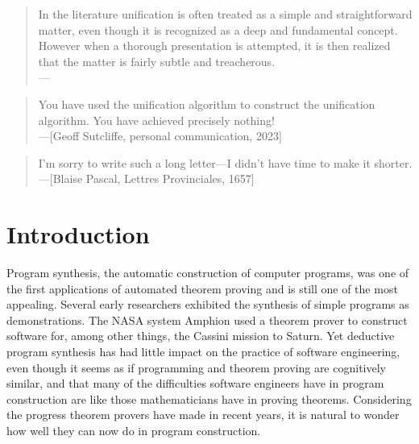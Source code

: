 \documentclass[runningheads]{llncs}
\begin{document}
%
%
%
\begin{quote}
  In the literature unification is often treated as a simple and straightforward matter, even though it is recognized as a deep and fundamental concept. However when a thorough presentation is attempted, it is then realized that the matter is fairly subtle and treacherous.
  \\---\citep{las:mah:mar}
 
\end{quote}

\begin{quote}
  You have used the unification algorithm to construct the unification algorithm.  You have achieved precisely nothing!
  \\---[Geoff Sutcliffe, personal communication, 2023]
\end{quote}

\begin{quote}
I'm sorry to write such a long letter---I didn't have time to make it shorter.
\\---[Blaise Pascal, Lettres Provinciales, 1657]
\end{quote}


\section{Introduction}

Program synthesis, the automatic construction of computer programs, was one of the first applications of automated theorem proving and is still one of the most appealing.  Several early researchers  \citep[e.g.,][]{sla, wal:lee, ccg} exhibited the synthesis of simple programs as demonstrations.  The NASA system Amphion  \citep{low} used a theorem prover to construct software for, among other things, the Cassini mission to Saturn.  Yet deductive program synthesis has had little impact on the practice of software engineering, even though it seems as if programming and theorem proving are cognitively similar, and that many of the difficulties software engineers have in program construction are like those mathematicians have in proving theorems. Considering the progress theorem provers have made in recent years, it is natural to wonder how well they can now do in program construction.
     
\end{document}
